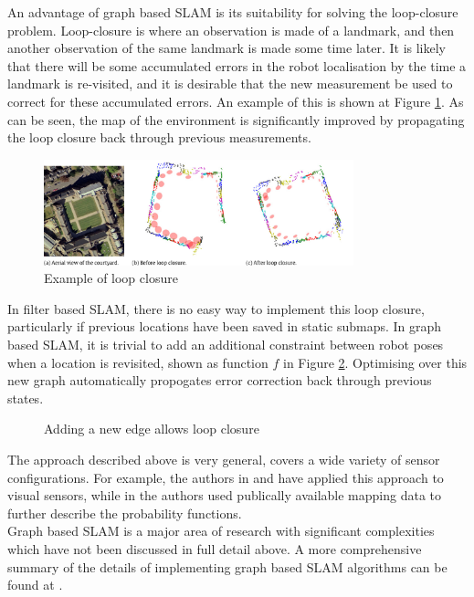 \documentclass[capstone_report.tex]{subfiles}
\begin{document}
An advantage of graph based SLAM is its suitability for solving the loop-closure problem. Loop-closure is where an observation is made of a landmark, and then another observation of the same landmark is made some time later. It is likely that there will be some accumulated errors in the robot localisation by the time a landmark is re-visited, and it is desirable that the new measurement be used to correct for these accumulated errors. An example of this is shown at Figure \ref{fig:loopClose}. As can be seen, the map of the environment is significantly improved by propagating the loop closure back through previous measurements.

\begin{figure}[H]
   \centering
   \includegraphics[width=0.8\textwidth]{imgs/loopClosure.png}
   \caption{Example of loop closure\label{fig:loopClose}}
\end{figure} 

In filter based SLAM, there is no easy way to implement this loop closure, particularly if previous locations have been saved in static submaps. In graph based SLAM, it is trivial to add an additional constraint between robot poses when a location is revisited, shown as function $f$ in Figure \ref{fig:loopClose2}. Optimising over this new graph automatically propogates error correction back through previous states.

\begin{figure}[H]
\centering
  
  \caption{Adding a new edge allows loop closure\label{fig:loopClose2}}
\end{figure}

The approach described above is very general, covers a wide variety of sensor configurations. For example, the authors in \cite{hong} and \cite{annaiyan} have applied this approach to visual sensors, while in \cite{vysotska} the authors used publically available mapping data to further describe the probability functions. \\

Graph based SLAM is a major area of research with significant complexities which have not been discussed in full detail above. A more comprehensive summary of the details of implementing graph based SLAM algorithms can be found at \cite{grisetti}. \\
\end{document}

